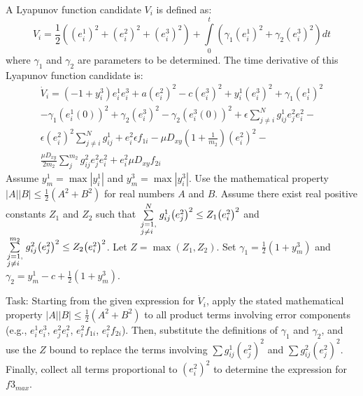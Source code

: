 \documentclass[10pt]{article}
\begin{document}
A Lyapunov function candidate $V_i$ is defined as:
$$
{V_i} = \frac{1}{2}\left( {{{\left( {e_i^1} \right)}^2} + {{\left( {e_i^2} \right)}^2} + {{\left( {e_i^3} \right)}^2}} \right) + \int\limits_0^t {\left( {{\gamma _1}{{\left( {e_i^1} \right)}^2} + {\gamma _2}{{\left( {e_i^3} \right)}^2}} \right)dt}
$$
where ${\gamma _1}$ and ${\gamma _2}$ are parameters to be determined. The time derivative of this Lyapunov function candidate is:
$$
\begin{array}{l}
{{\dot V}_i} = \left( {-1 + y_i^3} \right)e_i^1e_i^3 + a{\left( {e_i^2} \right)^2} - c{\left( {e_i^3} \right)^2} + y_i^1{\left( {e_i^3} \right)^2} + {\gamma _1}{\left( {e_i^1} \right)^2}\\
 - {\gamma _1}{\left( {e_i^1\left( 0 \right)} \right)^2} + {\gamma _2}{\left( {e_i^3} \right)^2} - {\gamma _2}{\left( {e_i^3\left( 0 \right)} \right)^2} + \epsilon \sum\limits_{j \ne i}^N {g_{ij}^1e_j^2e_i^2}  - \\
\epsilon {\left( {e_i^2} \right)^2}\sum\limits_{j \ne i}^N {g_{ij}^1}  + e_i^2\epsilon {{f_{1i}}}  - \mu {D_{xy}}\left( {1 + \frac{1}{{{m_2}}}} \right){\left( {e_i^2} \right)^2} - \\
\frac{{\mu {D_{xy}}}}{{2{m_2}}}\sum\limits_j^{{m_2}} {g _{ij}^2e_j^2e_i^2}  + e_i^2\mu {D_{xy}}{f_{2i}}
\end{array}
$$
Assume $y_m^1 = \max\left| {y_i^1} \right|$ and $y_m^3 = \max\left| {y_i^3} \right|$.
Use the mathematical property $\left| A \right|\left| B \right| \le \frac{1}{2}\left( {{A^2} + {B^2}} \right)$ for real numbers $A$ and $B$.
Assume there exist real positive constants $Z_1$ and $Z_2$ such that $\sum\limits_{\scriptstyle j = 1,\hfill\atop \scriptstyle j \ne i\hfill}^N {g_{ij}^1{{\left( {e_j^2} \right)}^2}} \le {Z_1}{\left( {e_i^2} \right)^2}$ and $\sum\limits_{\scriptstyle j = 1,\hfill\atop \scriptstyle j \ne i\hfill}^{{m_2}} {g _{ij}^2{{\left( {e_j^2} \right)}^2}} \le {Z_2}{\left( {e_i^2} \right)^2}$. Let $Z = \max\left( {Z_1, Z_2} \right)$.
Set ${\gamma _1} = \frac{1}{2}\left( {1 + y_m^3} \right)$ and ${\gamma _2} = y_m^1 - c + \frac{1}{2}\left( {1 + y_m^3} \right)$.

Task:
Starting from the given expression for $\dot V_i$, apply the stated mathematical property $\left| A \right|\left| B \right| \le \frac{1}{2}\left( {{A^2} + {B^2}} \right)$ to all product terms involving error components (e.g., $e_i^1 e_i^3$, $e_j^2 e_i^2$, $e_i^2 f_{1i}$, $e_i^2 f_{2i}$). Then, substitute the definitions of $\gamma_1$ and $\gamma_2$, and use the $Z$ bound to replace the terms involving $\sum g_{ij}^1 (e_j^2)^2$ and $\sum g_{ij}^2 (e_j^2)^2$. Finally, collect all terms proportional to ${\left( {e_i^2} \right)^2}$ to determine the expression for $f3_{max}$.
\end{document}
